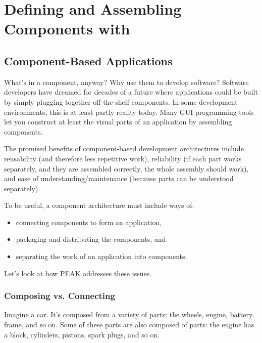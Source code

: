 \chapter{Defining and Assembling Components with }

\section{Component-Based Applications}

What's in a component, anyway?  Why use them to develop software?  Software
developers have dreamed for decades of a future where applications could be
built by simply plugging together off-the-shelf components.  In some
development environments, this is at least partly reality today.  Many GUI
programming tools let you construct at least the visual parts of an
application by assembling components.

The promised benefits of component-based development architectures include
reusability (and therefore less repetitive work), reliability (if each part
works separately, and they are assembled correctly, the whole assembly should
work), and ease of understanding/maintenance (because parts can be understood
separately).

To be useful, a component architecture must include ways of:

\begin{itemize}

\item connecting components to form an application,

\item packaging and distributing the components, and

\item separating the work of an application into components.

\end{itemize}

Let's look at how PEAK addresses these issues.











\subsection{Composing vs. Connecting}

Imagine a car.  It's composed from a variety of parts: the wheels, engine,
battery, frame, and so on.  Some of these parts are also composed of parts:
the engine has a block, cylinders, pistons, spark plugs, and so on.

